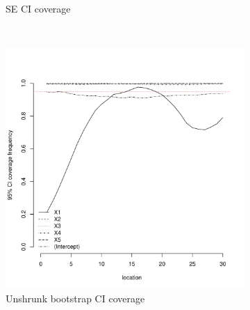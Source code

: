 \documentclass[authoryear, review, 11pt]{elsarticle}
\begin{document}
\begin{figure}
\begin{subfigure}[b]{0.45\textwidth}
		\caption{SE CI coverage}
	\end{subfigure}%
	\\%
	\begin{subfigure}[b]{0.45\textwidth}
	\centering
		\includegraphics[width=\textwidth]{../../figures/simulation/15.8.profile_unshrunk_bootstrap_coverage.pdf}
		\caption{Unshrunk bootstrap CI coverage}
	\end{subfigure}%
	~ %
	\begin{subfigure}[b]{0.45\textwidth}
	\centering

\end{subfigure}
\end{figure}
\end{document}
